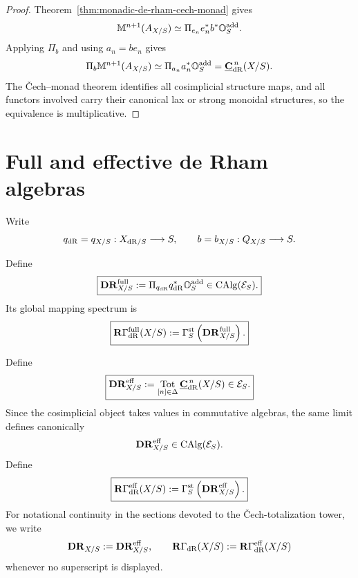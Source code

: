 \begin{proof}
Theorem~\ref{thm:monadic-de-rham-cech-monad} gives
\[
    \mathbb M^{n+1}(A_{X/S})
    \simeq
    \Pi_{e_n}e_n^*b^*\mathbb O_S^{\mathrm{add}}.
\]
Applying \(\Pi_b\) and using \(a_n=be_n\) gives
\[
    \Pi_b\mathbb M^{n+1}(A_{X/S})
    \simeq
    \Pi_{a_n}a_n^*\mathbb O_S^{\mathrm{add}}
    =
    \underline{\mathbf C}_{\mathrm{dR}}^{\,n}(X/S).
\]
The \v{C}ech--monad theorem identifies all cosimplicial structure maps, and all functors involved
carry their canonical lax or strong monoidal structures, so the equivalence is multiplicative.
\end{proof}


\section{Full and effective de Rham algebras}
\label{sec:total-modal-de-rham}

Write
\[
    q_{\mathrm{dR}}=q_{X/S}:X_{\mathrm{dR}/S}\longrightarrow S,
    \qquad
    b=b_{X/S}:Q_{X/S}\longrightarrow S.
\]

\begin{definition}
\label{def:full-modal-de-rham-object}
Define
\[
\boxed{
    \mathbf{DR}^{\mathrm{full}}_{X/S}
    :=
    \Pi_{q_{\mathrm{dR}}}q_{\mathrm{dR}}^*\mathbb O_S^{\mathrm{add}}
    \in
    \operatorname{CAlg}(\mathcal E_S).
}
\]
Its global mapping spectrum is
\[
\boxed{
    \mathbf R\Gamma_{\mathrm{dR}}^{\mathrm{full}}(X/S)
    :=
    \Gamma_S^{\mathrm{st}}
    \left(\mathbf{DR}^{\mathrm{full}}_{X/S}\right).
}
\]
\end{definition}

\begin{definition}
\label{def:total-modal-de-rham-object}
Define
\[
\boxed{
    \mathbf{DR}^{\mathrm{eff}}_{X/S}
    :=
    \operatorname*{Tot}_{[n]\in\Delta}
    \underline{\mathbf C}_{\mathrm{dR}}^{\,n}(X/S)
    \in
    \mathcal E_S.
}
\]
Since the cosimplicial object takes values in commutative algebras, the same limit defines
canonically
\[
    \mathbf{DR}^{\mathrm{eff}}_{X/S}
    \in
    \operatorname{CAlg}(\mathcal E_S).
\]
Define
\[
\boxed{
    \mathbf R\Gamma_{\mathrm{dR}}^{\mathrm{eff}}(X/S)
    :=
    \Gamma_S^{\mathrm{st}}
    \left(\mathbf{DR}^{\mathrm{eff}}_{X/S}\right).
}
\]
For notational continuity in the sections devoted to the \v{C}ech-totalization tower, we write
\[
    \mathbf{DR}_{X/S}:=\mathbf{DR}^{\mathrm{eff}}_{X/S},
    \qquad
    \mathbf R\Gamma_{\mathrm{dR}}(X/S)
    :=
    \mathbf R\Gamma_{\mathrm{dR}}^{\mathrm{eff}}(X/S)
\]
whenever no superscript is displayed.
\end{definition}

